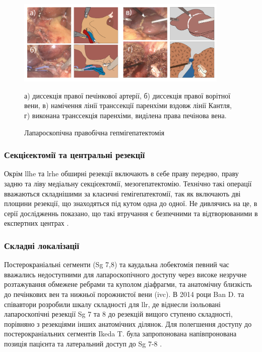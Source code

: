 \begin{figure}[h]
\caption{Лапароскопічна правобічна гепмігепатектомія}

\includegraphics[width=0.9\textwidth]{Illustrations/Chapter_01/RightLobe_Horizontal.png}
\label{fig:RightLobe}

\medskip
\small
а) диссекція правої печінкової артерії, б) диссекція правої ворітної вени, в) намічення лінії транссекції паренхіми вздовж лінії Кантля, г) виконана транссекція паренхіми, виділена права печінова вена.


\end{figure}

\subsubsection{Секцієектомії та центральні резекції}

Окрім \acrshort{llhe} та \acrshort{lrhe} обширні резекції включають в себе праву передню, праву задню та ліву медіальну секцієектомії, мезогепатектомію. Технічно такі операції вважаються складнішими за класичні гемігепатектомії, так як включають дві площини резекції, що знаходяться під кутом одна до одної. Не дивлячись на це, в серії дослідженнь показано, що такі втручання є безпечними та відтворюваними в експертних центрах \cite{Honda2014, Cheng2015, Kim2017, Siddiqi2018}. 

\subsubsection{Складні локалізації}

Постерокраніальні сегменти (Sg 7,8) та каудальна лобектомія певний час вважались недоступними для лапароскопічного доступу через високе незручне розтажування обмежене ребрами та куполом діафрагми, та анатомічну близкість до печінкових вен та нижньої порожнистої вени (\acrshort{ivc}). В 2014 роци Ban D. та співавтори розробили шкалу складності для \acrshort{llr}, де віднесли ізольовані лапароскопічні резекції Sg 7 та 8 до резекцій вищого ступеню складності, порівняно з резекціями інших анатомічних ділянок. Для полегшення доступу до постерокраніальних сегментів Ikeda T. була запропонована напівпронована позиція пацієнта та латеральний доступ до Sg 7-8 \cite{Ikeda2014}.

